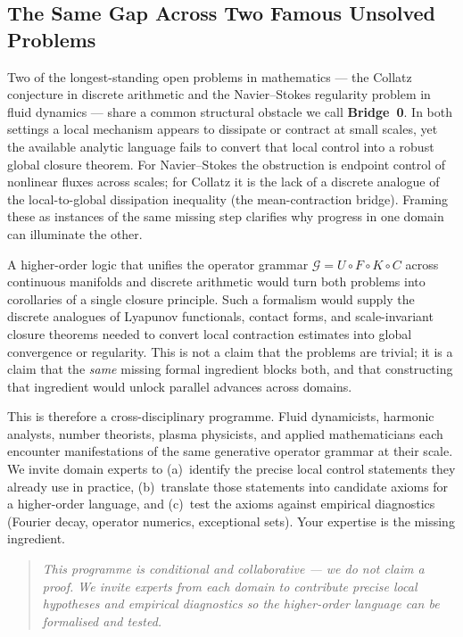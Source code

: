 \documentclass[11pt,a4paper]{article}
\begin{document}
\subsection{The Same Gap Across Two Famous Unsolved Problems}

Two of the longest-standing open problems in mathematics --- the
Collatz conjecture in discrete arithmetic and the Navier--Stokes
regularity problem in fluid dynamics --- share a common structural
obstacle we call \textbf{Bridge~0}.  In both settings a local mechanism
appears to dissipate or contract at small scales, yet the available
analytic language fails to convert that local control into a robust
global closure theorem.  For Navier--Stokes the obstruction is endpoint
control of nonlinear fluxes across scales; for Collatz it is the lack
of a discrete analogue of the local-to-global dissipation inequality
(the mean-contraction bridge).  Framing these as instances of the same
missing step clarifies why progress in one domain can illuminate the
other.

A higher-order logic that unifies the operator grammar
$\mathcal{G} = U \circ F \circ K \circ C$ across continuous manifolds and
discrete arithmetic would turn both problems into corollaries of a
single closure principle.  Such a formalism would supply the discrete
analogues of Lyapunov functionals, contact forms, and scale-invariant
closure theorems needed to convert local contraction estimates into
global convergence or regularity.  This is not a claim that the
problems are trivial; it is a claim that the \emph{same} missing formal
ingredient blocks both, and that constructing that ingredient would
unlock parallel advances across domains.

This is therefore a cross-disciplinary programme.  Fluid dynamicists,
harmonic analysts, number theorists, plasma physicists, and applied
mathematicians each encounter manifestations of the same generative
operator grammar at their scale.  We invite domain experts to
(a)~identify the precise local control statements they already use in
practice, (b)~translate those statements into candidate axioms for a
higher-order language, and (c)~test the axioms against empirical
diagnostics (Fourier decay, operator numerics, exceptional sets).
Your expertise is the missing ingredient.

\begin{quote}
\emph{This programme is conditional and collaborative --- we do not
claim a proof.  We invite experts from each domain to contribute
precise local hypotheses and empirical diagnostics so the higher-order
language can be formalised and tested.}
\end{quote}
\end{document}
